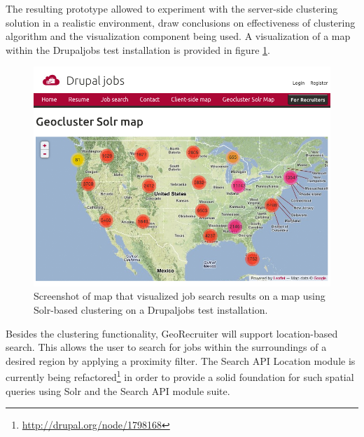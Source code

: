 The resulting prototype allowed to experiment with the server-side clustering solution in a realistic environment, draw conclusions on effectiveness of clustering algorithm and the visualization component being used. A visualization of a map within the Drupaljobs test installation is provided in figure \ref{fig:drupaljobs-geocluster-solr}.

\begin{figure}[h]
  \begin{center}
    \includegraphics[width=1\textwidth]{figures/drupaljobs_geocluster_solr.png}
    \caption{Screenshot of map that visualized job search results on a map using Solr-based clustering on a Drupaljobs test installation.}
    \label{fig:drupaljobs-geocluster-solr}
  \end{center}
\end{figure}


Besides the clustering functionality, GeoRecruiter will support location-based search. This allows the user to search for jobs within the surroundings of a desired region by applying a proximity filter. The Search API Location module is currently being refactored\footnote{\url{http://drupal.org/node/1798168}} in order to provide a solid foundation for such spatial queries using Solr and the Search API module suite.








